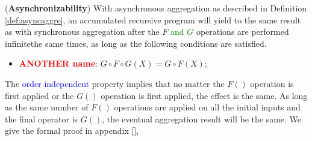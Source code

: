 {	\begin{theorem}
		\label{th:async}
		(\textbf{Asynchronizability}) With asynchronous aggregation as described in Definition \ref{def:asyncaggre}, an accumulated recursive program will yield to the same result as with synchronous aggregation after the $F$ \textcolor{green}{and $G$} operations are performed {\color{green}infinite}the same times, as long as the following conditions are satisfied.
		\begin{itemize}
			\item \textbf{\textcolor{red}{ANOTHER name}}: $G\circ F\circ G(X)=G\circ F(X)$;
		\end{itemize}
	\end{theorem}
	The \textcolor{blue}{order independent} property implies that no matter the $F()$ operation is first applied or the $G()$ operation is first applied, the effect is the same. As long as the same number of $F()$ operations are applied on all the initial inputs and the final operator is $G()$, the eventual aggregation result will be the same.%
	We give the formal proof in appendix \ref{},
	}
